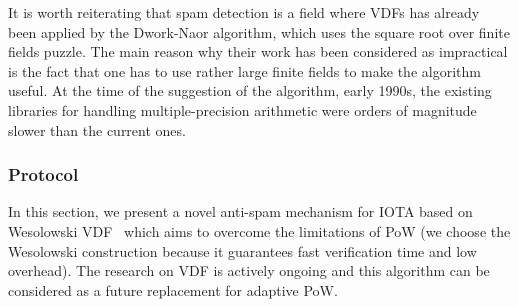 \documentclass[../main.tex]{subfiles}
\begin{document}
It is worth reiterating that spam detection is a field where VDFs has already been applied by the Dwork-Naor algorithm, which uses the square root over finite fields puzzle. The main reason why their work has been considered as impractical is the fact that one has to use rather large finite fields to make the algorithm useful. At the time of the suggestion of the algorithm, early 1990s, the existing libraries for handling multiple-precision arithmetic were orders of magnitude slower than the current ones. %

\subsubsection{Protocol}

In this section, we present a novel anti-spam mechanism for IOTA based on Wesolowski VDF~\cite{Wesolowski} which aims to overcome the limitations of PoW (we choose the Wesolowski construction because it guarantees fast verification time and low overhead). The research on VDF is actively ongoing and this algorithm can be considered as a future replacement for adaptive PoW.
\end{document}
